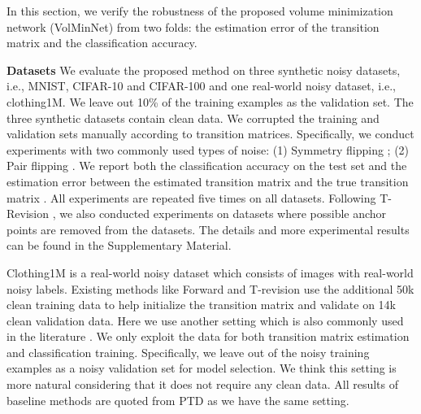 \documentclass{article}
\begin{document}
In this section, we verify the robustness of the proposed volume minimization network (VolMinNet) from two folds: the estimation error of the transition matrix and the classification accuracy.

\textbf{Datasets} We evaluate the proposed method on three synthetic noisy datasets, i.e.,
MNIST, CIFAR-10 and CIFAR-100 and one real-world noisy dataset, i.e., clothing1M. We leave out 10\% of the training examples as the validation set. The three synthetic datasets contain clean data. We corrupted the training and validation sets manually according to transition matrices. Specifically, we conduct experiments with two commonly used types of noise: (1) Symmetry flipping \cite{patrini2017making}; (2) Pair flipping  \cite{han2018co}. We report both the classification accuracy on the test set and the estimation error between the estimated transition matrix  and the true transition matrix . All experiments are repeated five times on all datasets. Following T-Revision \cite{xia2019anchor}, we also conducted experiments on datasets where possible anchor points are removed from the datasets. The details and more experimental results can be found in the Supplementary Material.



Clothing1M is a real-world noisy dataset which consists of  images with real-world noisy labels. Existing methods like Forward \cite{patrini2017making} and T-revision \cite{xia2019anchor} use the additional 50k clean training data to help initialize the transition matrix and validate on 14k clean validation data. Here we use another setting which is also commonly used in the literature \cite{xia2020part}. We only exploit the  data for both transition matrix estimation and classification training. Specifically, we leave out  of the noisy training examples as a noisy validation set for model selection. We think this setting is more natural considering that it does not require any clean data. All results of baseline methods are quoted from PTD \cite{xia2020part} as we have the same setting. 
\end{document}
